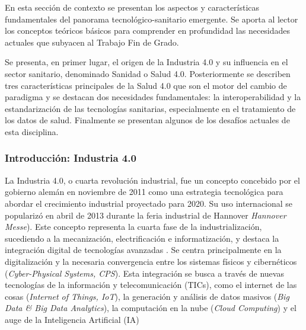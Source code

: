 En esta sección de contexto se presentan los aspectos y características fundamentales del panorama tecnológico-sanitario emergente. Se aporta al lector los conceptos teóricos básicos para comprender en profundidad las necesidades actuales que subyacen al Trabajo Fin de Grado.
 

Se presenta, en primer lugar, el origen de la Industria 4.0 y su influencia en el sector sanitario, denominado Sanidad o Salud 4.0. 
Posteriormente se describen tres características principales de la Salud 4.0 que son el motor del cambio de paradigma y se destacan dos necesidades fundamentales: la interoperabilidad y la estandarización de las tecnologías sanitarias, especialmente en el tratamiento de los datos de salud. Finalmente se presentan algunos de los desafíos actuales de esta disciplina.


\subsubsection{Introducción: Industria 4.0}

La Industria 4.0, o cuarta revolución industrial, fue un concepto concebido por el gobierno alemán en noviembre de 2011 como una estrategia tecnológica para abordar el crecimiento industrial proyectado para 2020. Su uso internacional se popularizó en abril de 2013 durante la feria industrial de Hannover \textit{Hannover Messe}). Este concepto representa la cuarta fase de la industrialización, sucediendo a la mecanización, electrificación e informatización, y destaca la integración digital de tecnologías avanzadas \cite{lasi2014industry}.
Se centra principalmente en la digitalización y la necesaria convergencia entre los sistemas físicos y cibernéticos (\textit{Cyber-Physical Systems, CPS}). Esta integración se busca a través de nuevas tecnologías de la información y telecomunicación (TICs), como el internet de las cosas (\textit{Internet of Things, IoT}), la generación y análisis de datos masivos (\textit{Big Data \& Big Data Analytics}), la computación en la nube (\textit{Cloud Computing}) y el auge de la Inteligencia Artificial (IA) \cite{lasi2014industry}\cite{chen2020times}\cite{tortorella2020healthcare}

